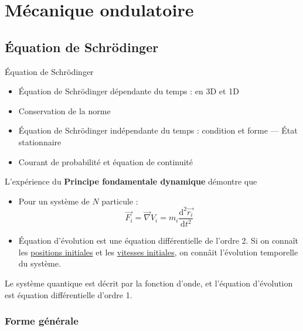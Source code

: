 \chapter{Mécanique ondulatoire} %
\label{chap:Mécanique ondulatoire}

\section{Équation de Schrödinger} %

\begin{tcolorbox}
Équation de Schrödinger
\begin{itemize}

    \item Équation de Schrödinger dépendante du temps : en 3D et 1D 
    \item Conservation de la norme 
    \item Équation de Schrödinger indépendante du temps : condition et forme — État stationnaire 
    \item Courant de probabilité et équation de continuité

\end{itemize}
\end{tcolorbox}

\begin{note}{}{}
L'expérience du \textbf{Principe fondamentale dynamique} démontre que 
\begin{itemize}

    \item Pour un système de $N$ particule : 
      \begin{equation}
        \overrightarrow{F_i} = \overrightarrow{\nabla} V_i = m_i \frac{\mathrm{d} ^{2} \overrightarrow{r_i}}{\mathrm{d} t ^{2}} 
      \end{equation}

    \item Équation d'évolution est une équation différentielle de l'ordre 2. Si on connaît les \underline{positions initiales} et les \underline{vitesses initiales}, on connâit l'évolution temporelle du système.

\end{itemize}

Le système quantique est décrit par la fonction d'onde, et l'équation d'évolution est équation différentielle d'ordre 1.
\end{note}

\subsection{Forme générale} %

